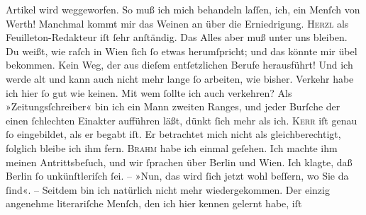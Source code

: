 \begin{ledgroupsized}[t]{13cm}
               Artikel wird weggeworfen.  So muß ich mich
               behandeln laſſen, ich, ein Menſch von Werth! Manchmal kommt mir das Weinen an über
               die Erniedrigung.\pend
           \pstart
           \textsc{Herzl} als Feuilleton-Redakteur
               iſt ſehr anſtändig. Das Alles aber muß unter uns bleiben. Du weißt, wie raſch in Wien ſich ſo etwas herumſpricht; und das könnte mir
               übel bekommen.\pend
           \pstart
           Kein Weg, der aus dieſem entſetzlichen Berufe herausführt! Und ich werde alt und kann
               auch nicht mehr lange ſo arbeiten, wie bisher.\pend
           \pstart
           Verkehr habe ich hier ſo gut wie keinen. {\pb}Mit wem
               ſollte ich auch verkehren? Als »Zeitungsſchreiber« bin ich ein Mann zweiten Ranges,
               und jeder Burſche der einen ſchlechten Einakter aufführen läßt, dünkt ſich mehr als
               ich. \textsc{Kerr} iſt genau ſo eingebildet, als er begabt iſt. Er betrachtet mich nicht als
               gleichberechtigt, folglich bleibe ich ihm fern. \textsc{Brahm} habe ich einmal geſehen. Ich machte ihm meinen Antrittsbeſuch, und  wir ſprachen über Berlin und Wien. Ich klagte, daß Berlin ſo unkünſtleriſch ſei. – »Nun, das wird ſich jetzt wohl
               beſſern, wo Sie da ſind«. – Seitdem bin ich natürlich nicht mehr wiedergekommen. Der
               einzig angenehme literariſche Menſch, den ich hier kennen gelernt habe, iſt \label{K_L02907-7v}
\end{ledgroupsized}
